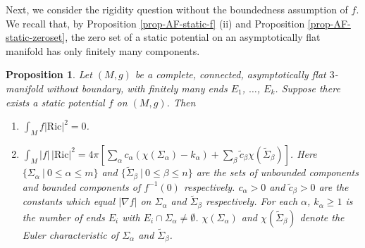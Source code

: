 \documentclass[12pt]{amsart}
\newtheorem{prop}{Proposition}[section]
\theoremstyle{remark}
\numberwithin{equation}{section}
\newcommand{\Ric}{\mbox{Ric}}
\def\lf{\left}
\def\ri{\right}
\def\a{\alpha}
\begin{document}
Next, we consider  the rigidity question  without the boundedness assumption of $f$.
We recall that, by Proposition \ref{prop-AF-static-f} (ii) and Proposition \ref{prop-AF-static-zeroset},
 the zero set of a static potential  on an asymptotically flat manifold  has only  finitely many components.


\begin{prop}  \label{prop-integration}
Let $(M,g)$ be a complete, connected, asymptotically flat $3$-manifold without boundary,  with finitely many ends $E_1$, $\ldots$, $E_k$.
Suppose there exists a static potential $f$  on $(M, g)$. Then
\begin{enumerate}
  \item [(i)]  $ \displaystyle  \int_M f|\Ric|^2=0 $.
  \item [(ii)]
  $  \displaystyle   \int_M |f|\,|\Ric|^2=4\pi\lf[ \sum_\a c_\a(\chi(\Sigma_\a)-k_\a)+\sum_\beta \tilde c_\beta\chi(\tilde \Sigma_\beta)\ri]  $.
Here   $ \{ \Sigma_\alpha \ |  \ 0 \le \alpha \le m   \} $ and  $ \{ \tilde \Sigma_\beta \ | \ 0 \le \beta \le n  \} $ are  the sets of  unbounded components and bounded components  of
$f^{-1} (0)$  respectively.    $ c_\a > 0$ and $\tilde{c}_\beta > 0$ are  the constants which equal $|\nabla f |$ on $\Sigma_\a $ and $\tilde{\Sigma}_\beta$ respectively.
For each $\a$, $k_\a \ge 1 $ is the number of ends $E_i$ with $E_i \cap \Sigma_\a \neq \emptyset$.
 $ \chi (\Sigma_\a)$ and $\chi (\tilde{\Sigma}_\beta )$ denote the Euler characteristic of $\Sigma_\a$ and $\tilde{\Sigma}_\beta$.
\end{enumerate}
\end{prop}
\end{document}
